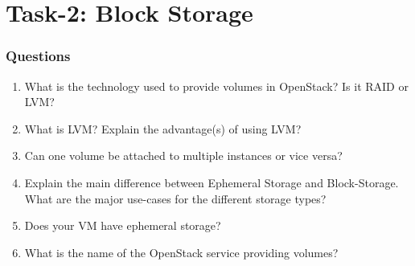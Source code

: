 \documentclass[a4paper,11pt]{article}
\begin{document}
\newpage
\part{Task-2: Block Storage}
\section{Questions}
\begin{enumerate}
    \item What is the technology used to provide volumes in OpenStack? Is it RAID or LVM?
    \item What is LVM? Explain the advantage(s) of using LVM?
    \item Can one volume be attached to multiple instances or vice versa?
    \item Explain the main difference between Ephemeral Storage and Block-Storage. What are the major use-cases for the different storage types?
    \item Does your VM have ephemeral storage?
    \item What is the name of the OpenStack service providing volumes?
\end{enumerate}
\end{document}
